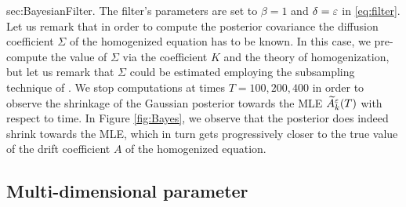 \documentclass[10pt]{article}
\begin{document}
{sec:BayesianFilter}. The filter's parameters are set to $\beta = 1$ and $\delta = \varepsilon$ in \eqref{eq:filter}. Let us remark that in order to compute the posterior covariance the diffusion coefficient $\Sigma$ of the homogenized equation has to be known. In this case, we pre-compute the value of $\Sigma$ via the coefficient $K$ and the theory of homogenization, but let us remark that $\Sigma$ could be estimated employing the subsampling technique of \cite{PaS07}. We stop computations at times $T = 100, 200, 400$ in order to observe the shrinkage of the Gaussian posterior towards the MLE $\widetilde A^\varepsilon_k(T)$ with respect to time. In Figure \ref{fig:Bayes}, we observe that the posterior does indeed shrink towards the MLE, which in turn gets progressively closer to the true value of the drift coefficient $A$ of the homogenized equation.


\subsection{Multi-dimensional parameter}
\end{document}
